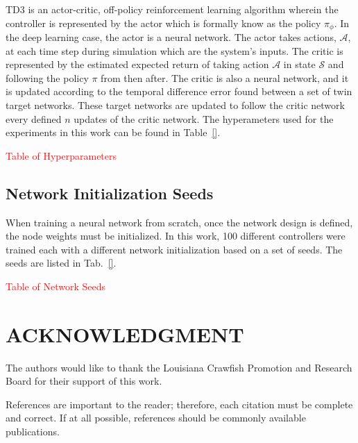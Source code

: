 \documentclass[letterpaper, 10 pt, conference]{ieeeconf}  %
\begin{document}
TD3 is an actor-critic, off-policy reinforcement learning algorithm wherein the controller is represented by the actor which is formally know as the policy $\pi_{\phi}$. In the deep learning case, the actor is a neural network. The actor takes actions, $\mathcal{A}$, at each time step during simulation which are the system's inputs. The critic is represented by the estimated expected return of taking action $\mathcal{A}$ in state $\mathcal{S}$ and following the policy $\pi$ from then after. The critic is also a neural network, and it is updated according to the temporal difference error found between a set of twin target networks. These target networks are updated to follow the critic network every defined $n$ updates of the critic network. The hyperameters used for the experiments in this work can be found in Table~\ref{}.

\textcolor{red}{Table of Hyperparameters}

\subsection*{Network Initialization Seeds}
When training a neural network from scratch, once the network design is defined, the node weights must be initialized. In this work, 100 different controllers were trained each with a different network initialization based on a set of seeds. The seeds are listed in Tab.~\ref{}.

\textcolor{red}{Table of Network Seeds}

\section*{ACKNOWLEDGMENT}

The authors would like to thank the Louisiana Crawfish Promotion and Research Board for their support of this work.



References are important to the reader; therefore, each citation must be complete and correct. If at all possible, references should be commonly available publications.
\end{document}
